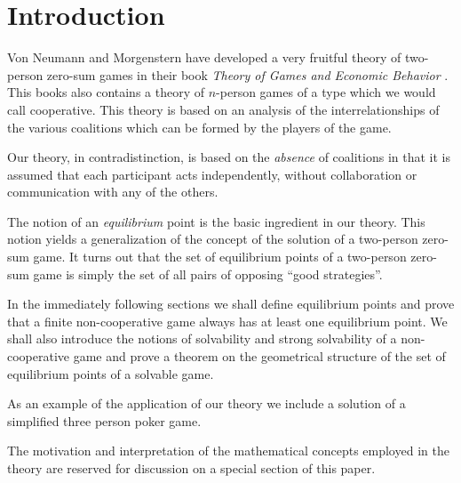 \setcounter{page}{1}

\section{Introduction}
\hspace{\parindent}Von Neumann and Morgenstern have developed a very fruitful theory of two-person zero-sum games in their book \emph{Theory of Games and Economic Behavior} \cite{1}. This books also contains a theory of $n$-person games of a type which we would call cooperative. This theory is based on an analysis of the interrelationships of the various coalitions which can be formed by the players of the game.

Our theory, in contradistinction, is based on the \emph{absence} of coalitions in that it is assumed that each participant acts independently, without collaboration or communication with any of the others.

The notion of an \emph{equilibrium} point is the basic ingredient in our theory. This notion yields a generalization of the concept of the solution of a two-person zero-sum game. It turns out that the set of equilibrium points of a two-person zero-sum game is simply the set of all pairs of opposing ``good strategies''.

In the immediately following sections we shall define equilibrium points and prove that a finite non-cooperative game always has at least one equilibrium point. We shall also introduce the notions of solvability and strong solvability of a non-cooperative game and prove a theorem on the geometrical structure of the set of equilibrium points of a solvable game.

As an example of the application of our theory we include a solution of a simplified three person poker game.

The motivation and interpretation of the mathematical concepts employed in the theory are reserved for discussion on a special section of this paper.

\thispagestyle{empty}
\clearpage

\newpage
\setcounter{page}{2}
